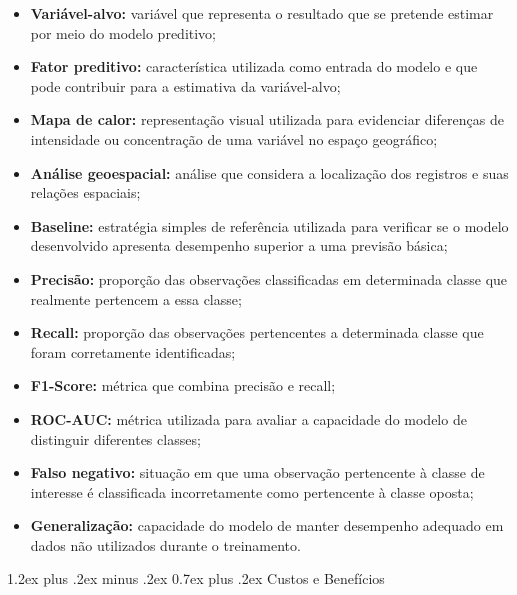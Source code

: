 \documentclass[11pt,a4paper]{article}
\makeatletter
\renewcommand\subsection{
\@startsection{subsection}{2}{0pt}%
{1.2ex plus .2ex minus .2ex}%
{0.7ex plus .2ex}%
{\normalfont\large\bfseries}
}
\makeatother
\begin{document}
\begin{itemize}

    \item \textbf{Variável-alvo:}
    variável que representa o resultado que se pretende estimar por meio do modelo preditivo;

    \item \textbf{Fator preditivo:}
    característica utilizada como entrada do modelo e que pode contribuir para a estimativa da variável-alvo;

    \item \textbf{Mapa de calor:}
    representação visual utilizada para evidenciar diferenças de intensidade ou concentração de uma variável no espaço geográfico;

    \item \textbf{Análise geoespacial:}
    análise que considera a localização dos registros e suas relações espaciais;

    \item \textbf{Baseline:}
    estratégia simples de referência utilizada para verificar se o modelo desenvolvido apresenta desempenho superior a uma previsão básica;

    \item \textbf{Precisão:}
    proporção das observações classificadas em determinada classe que realmente pertencem a essa classe;

    \item \textbf{Recall:}
    proporção das observações pertencentes a determinada classe que foram corretamente identificadas;

    \item \textbf{F1-Score:}
    métrica que combina precisão e recall;

    \item \textbf{ROC-AUC:}
    métrica utilizada para avaliar a capacidade do modelo de distinguir diferentes classes;

    \item \textbf{Falso negativo:}
    situação em que uma observação pertencente à classe de interesse é classificada incorretamente como pertencente à classe oposta;

    \item \textbf{Generalização:}
    capacidade do modelo de manter desempenho adequado em dados não utilizados durante o treinamento.

\end{itemize}


\subsection{Custos e Benefícios}
\end{document}
